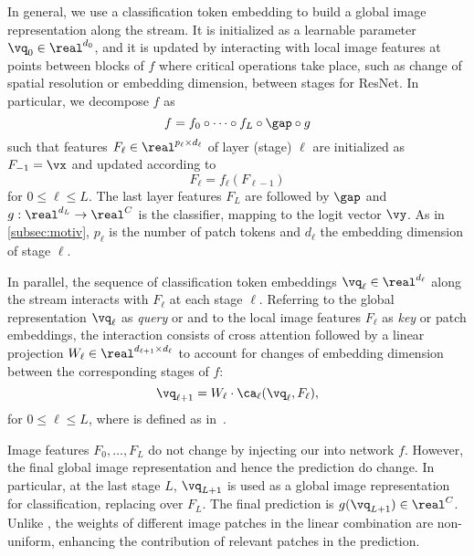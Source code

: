In general, we use a classification token embedding to build a global image representation along the stream. It is initialized as a learnable parameter $\vq_0 \in \real^{d_0}$, and it is updated by interacting with local image features at points between blocks of $f$ where critical operations take place, such as change of spatial resolution or embedding dimension, \eg between stages for ResNet. In particular, we decompose $f$ as
\begin{equation}
	f = f_0 \circ \dots \circ f_L \circ \gap \circ g
\label{eq:f-decomp}
\end{equation}
such that features $F_\ell \in \real^{p_\ell \times d_\ell}$ of layer (stage) $\ell$ are initialized as $F_{-1} = \vx$ and updated according to
\begin{equation}
	F_\ell = f_\ell(F_{\ell-1})
\label{eq:f-layer}
\end{equation}
for $0 \le \ell \le L$. The last layer features $F_L$ are followed by $\gap$ and $g: \real^{d_L} \to \real^C$ is the classifier, mapping to the logit vector $\vy$. As in \autoref{subsec:motiv}, $p_\ell$ is the number of patch tokens and $d_\ell$ the embedding dimension of stage $\ell$.

In parallel, the sequence of classification token embeddings $\vq_\ell \in \real^{d_\ell}$ along the stream interacts with $F_\ell$ at each stage $\ell$. Referring to the global representation $\vq_\ell$ as \emph{query} or \cls and to the local image features $F_\ell$ as \emph{key} or patch embeddings, the interaction consists of cross attention followed by a linear projection $W_\ell \in \real^{d_{\ell+1} \times d_\ell}$ to account for changes of embedding dimension between the corresponding stages of $f$:
\begin{equation}
	\vq_{\ell+1} = W_\ell \cdot \ca_\ell(\vq_\ell, F_\ell),
\label{eq:qk-layer}
\end{equation}
for $0 \le \ell \le L$, where \ca is defined as in~.

Image features $F_0, \dots, F_L$ do not change by injecting our \Ours into network $f$. However, the final global image representation and hence the prediction do change. In particular, at the last stage $L$, $\vq_{L+1}$ is used as a global image representation for classification, replacing \gap over $F_L$. The final prediction is $g(\vq_{L+1}) \in \real^C$. Unlike \gap, the weights of different image patches in the linear combination are non-uniform, enhancing the contribution of relevant patches in the prediction.
